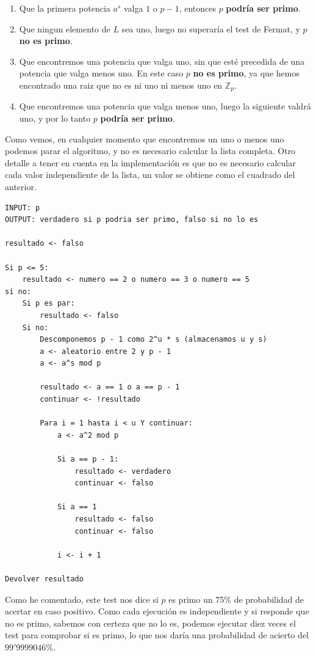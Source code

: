 \documentclass[12pt, spanish]{article}
\begin{document}
\begin{enumerate}
	\item Que la primera potencia $a^s$ valga $1$ o $p - 1$, entonces $p$ \textbf{podría ser primo}.
	\item Que ningun elemento de $L$ sea uno, luego no superaría el test de Fermat, y $p$ \textbf{no es primo}.
	\item Que encontremos una potencia que valga uno, sin que esté precedida de una potencia que valga menos uno. En este caso $p$ \textbf{no es primo}, ya que hemos encontrado una raiz que no es ni uno ni menos uno en $\mathbb{Z}_p$.
	\item Que encontremos una potencia que valga menos uno, luego la siguiente valdrá uno, y por lo tanto $p$ \textbf{podría ser primo}.
\end{enumerate}

Como vemos, en cualquier momento que encontremos un uno o menos uno podemos parar el algoritmo, y no es necesario calcular la lista completa. Otro detalle a tener en cuenta en la implementación es que no es necesario calcular cada valor independiente de la lista, un valor se obtiene como el cuadrado del anterior.

\begin{lstlisting}[caption={Test de Miller-Rabin}]
INPUT: p
OUTPUT: verdadero si p podria ser primo, falso si no lo es

resultado <- falso

Si p <= 5:
	resultado <- numero == 2 o numero == 3 o numero == 5
si no:
	Si p es par:
		resultado <- falso
	Si no:
		Descomponemos p - 1 como 2^u * s (almacenamos u y s)
		a <- aleatorio entre 2 y p - 1
		a <- a^s mod p

		resultado <- a == 1 o a == p - 1
		continuar <- !resultado

		Para i = 1 hasta i < u Y continuar:
			a <- a^2 mod p

			Si a == p - 1:
				resultado <- verdadero
				continuar <- falso

			Si a == 1
				resultado <- falso
				continuar <- falso

			i <- i + 1

Devolver resultado
\end{lstlisting}

Como he comentado, este test nos dice si $p$ es primo un 75\% de probabilidad de acertar en caso positivo. Como cada ejecución es independiente y si responde que no es primo, sabemos con certeza que no lo es, podemos ejecutar diez veces el test para comprobar si es primo, lo que nos daría una probabilidad de acierto del $99'9999046\%$.
\end{document}
